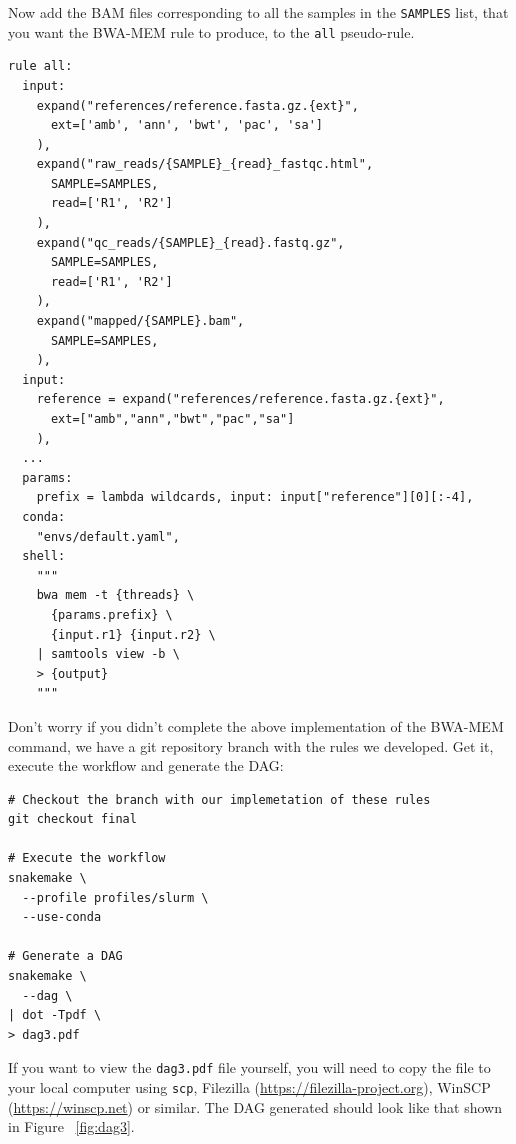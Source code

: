 \begin{questions}

Now add the BAM files corresponding to all the samples in the \texttt{SAMPLES} list, that you want the BWA-MEM rule to produce, to the \texttt{all} pseudo-rule.

\begin{answer}

\begin{lstlisting}
rule all:
  input:
    expand("references/reference.fasta.gz.{ext}",
      ext=['amb', 'ann', 'bwt', 'pac', 'sa']
    ),
    expand("raw_reads/{SAMPLE}_{read}_fastqc.html",
      SAMPLE=SAMPLES,
      read=['R1', 'R2']
    ),
    expand("qc_reads/{SAMPLE}_{read}.fastq.gz",
      SAMPLE=SAMPLES,
      read=['R1', 'R2']
    ),
    expand("mapped/{SAMPLE}.bam",
      SAMPLE=SAMPLES,
    ),
  input:
    reference = expand("references/reference.fasta.gz.{ext}",
      ext=["amb","ann","bwt","pac","sa"]
    ),
  ...
  params:
    prefix = lambda wildcards, input: input["reference"][0][:-4],
  conda:
    "envs/default.yaml",
  shell:
    """
    bwa mem -t {threads} \
      {params.prefix} \
      {input.r1} {input.r2} \
    | samtools view -b \
    > {output}
    """
\end{lstlisting}

\end{answer}

\end{questions}

Don't worry if you didn't complete the above implementation of the BWA-MEM command, we have a git repository branch with the rules we developed.
Get it, execute the workflow and generate the DAG:

\begin{lstlisting}
# Checkout the branch with our implemetation of these rules
git checkout final

# Execute the workflow
snakemake \
  --profile profiles/slurm \
  --use-conda

# Generate a DAG
snakemake \
  --dag \
| dot -Tpdf \
> dag3.pdf
\end{lstlisting}

\begin{warning}

If you want to view the \texttt{dag3.pdf} file yourself, you will need to copy the file to your local computer using \texttt{scp}, Filezilla (\url{https://filezilla-project.org}), WinSCP (\url{https://winscp.net}) or similar.
The DAG generated should look like that shown in Figure ~\ref{fig:dag3}.

\end{warning}

